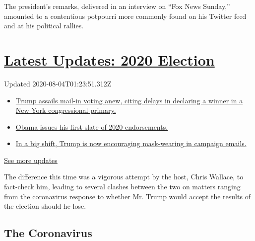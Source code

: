 The president's remarks, delivered in an interview on ``Fox News
Sunday,'' amounted to a contentious potpourri more commonly found on his
Twitter feed and at his political rallies.

\hypertarget{latest-updates-2020-election}{%
\section{\texorpdfstring{\href{https://www.nytimes3xbfgragh.onion/2020/08/03/us/elections/biden-vs-trump.html?action=click\&pgtype=Article\&state=default\&region=MAIN_CONTENT_1\&context=storylines_live_updates}{Latest
Updates: 2020
Election}}{Latest Updates: 2020 Election}}\label{latest-updates-2020-election}}

Updated 2020-08-04T01:23:51.312Z

\begin{itemize}
\tightlist
\item
  \href{https://www.nytimes3xbfgragh.onion/2020/08/03/us/elections/biden-vs-trump.html?action=click\&pgtype=Article\&state=default\&region=MAIN_CONTENT_1\&context=storylines_live_updates\#link-6494b448}{Trump
  assails mail-in voting anew, citing delays in declaring a winner in a
  New York congressional primary.}
\item
  \href{https://www.nytimes3xbfgragh.onion/2020/08/03/us/elections/biden-vs-trump.html?action=click\&pgtype=Article\&state=default\&region=MAIN_CONTENT_1\&context=storylines_live_updates\#link-3de249e6}{Obama
  issues his first slate of 2020 endorsements.}
\item
  \href{https://www.nytimes3xbfgragh.onion/2020/08/03/us/elections/biden-vs-trump.html?action=click\&pgtype=Article\&state=default\&region=MAIN_CONTENT_1\&context=storylines_live_updates\#link-54e34d20}{In
  a big shift, Trump is now encouraging mask-wearing in campaign
  emails.}
\end{itemize}

\href{https://www.nytimes3xbfgragh.onion/2020/08/03/us/elections/biden-vs-trump.html?action=click\&pgtype=Article\&state=default\&region=MAIN_CONTENT_1\&context=storylines_live_updates}{See
more updates}

The difference this time was a vigorous attempt by the host, Chris
Wallace, to fact-check him, leading to several clashes between the two
on matters ranging from the coronavirus response to whether Mr. Trump
would accept the results of the election should he lose.

\hypertarget{the-coronavirus}{%
\subsection{The Coronavirus}\label{the-coronavirus}}

